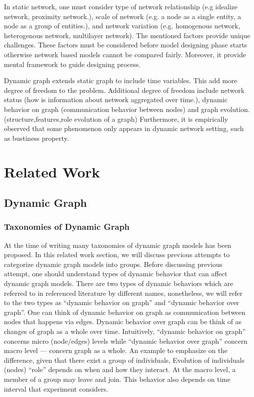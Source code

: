 \documentclass{IEEEtran}
\begin{document}
In static network, one must consider type of network relationship (e.g idealize network, proximity network.), scale of network (e.g. a node as a single entity, a node as a group of entities.), and network variation (e.g. homogenous network, heterogenous network, multilayer network). The mentioned factors provide unique challenges. These factors must be considered before model designing phase starts otherwise network based models cannot be compared fairly. Moreover, it provide mental framework to guide designing process.

Dynamic graph extends static graph to include time variables. This add more degree of freedom to the problem. Additional degree of freedom include network status (how is information about network aggregated over time.), dynamic behavior on graph (communication behavior between nodes) and graph evolution. (structure,features,role evolution of a graph) Furthermore, it is empirically observed that some phenomenon only appears in dynamic network setting, such as bustiness property.

\section{Related Work}
\label{sec:org44f8a8c}
\subsection{Dynamic Graph}
\label{sec:orgb9666f4}
\subsubsection{Taxonomies of Dynamic Graph}
\label{taxonomies of dynamic graph}
At the time of writing many taxonomies of dynamic graph models has been proposed.
In this related work section, we will discuss previous attempts to categorize dynamic graph models into groups. Before discussing previous attempt, one should understand types of dynamic behavior that can affect dynamic graph models. There are two types of dynamic behaviors which are referred to in referenced literature by different names, nonetheless, we will refer to the two types as ``dynamic behavior on graph'' and ``dynamic behavior over graph''. One can think of dynamic behavior on graph as communication between nodes that happens via edges. Dynamic  behavior over graph can be think of as changes of graph as a whole over time. Intuitively, ``dynamic behavior on graph'' concerns micro (node/edges) levels while ``dynamic behavior over graph'' concern macro level --- concern graph as a whole. An example to emphasize on the difference, given that there exist a group of individuals, Evolution of individuals (nodes) ``role'' depends on when and how they interact. At the macro level, a member of a group may leave and join. This behavior also depends on time interval that experiment considers.
\end{document}
